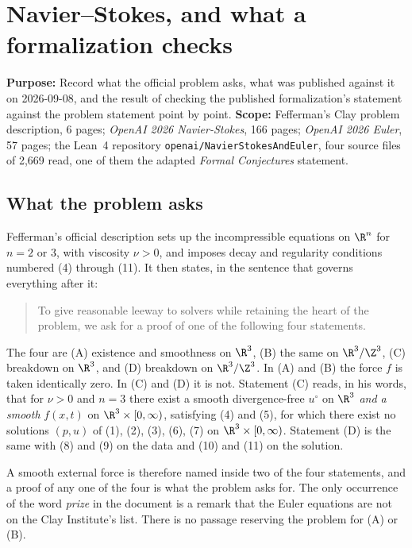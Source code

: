 \chapter{Navier--Stokes, and what a formalization checks}

\textbf{Purpose:} Record what the official problem asks, what was published against it on
2026-09-08, and the result of checking the published formalization's statement against the problem
statement point by point. \textbf{Scope:} Fefferman's Clay problem description, 6 pages;
\emph{OpenAI 2026 Navier-Stokes}, 166 pages; \emph{OpenAI 2026 Euler}, 57 pages; the Lean~4
repository \texttt{openai/\allowbreak{}NavierStokesAndEuler}, four source files of 2{,}669 read,
one of them the adapted \emph{Formal Conjectures} statement.

\section{What the problem asks}

Fefferman's official description sets up the incompressible equations on $\R^n$ for $n=2$ or $3$,
with viscosity $\nu > 0$, and imposes decay and regularity conditions numbered (4) through (11). It
then states, in the sentence that governs everything after it:

\begin{quote}
To give reasonable leeway to solvers while retaining the heart of the problem, we ask for a proof
of one of the following four statements.
\end{quote}

The four are (A) existence and smoothness on $\R^3$, (B) the same on $\R^3/\Z^3$, (C) breakdown on
$\R^3$, and (D) breakdown on $\R^3/\Z^3$. In (A) and (B) the force $f$ is taken identically zero. In
(C) and (D) it is not. Statement (C) reads, in his words, that for $\nu>0$ and $n=3$ there exist a
smooth divergence-free $u^\circ$ on $\R^3$ \emph{and a smooth} $f(x,t)$ on
$\R^3\times[0,\infty)$, satisfying (4) and (5), for which there exist no solutions $(p,u)$ of (1),
(2), (3), (6), (7) on $\R^3\times[0,\infty)$. Statement (D) is the same with (8) and (9) on the data
and (10) and (11) on the solution.

A smooth external force is therefore named inside two of the four statements, and a proof of any
one of the four is what the problem asks for. The only occurrence of the word \emph{prize} in the document
is a remark that the Euler equations are not on the Clay Institute's list. There is no passage
reserving the problem for (A) or (B).

